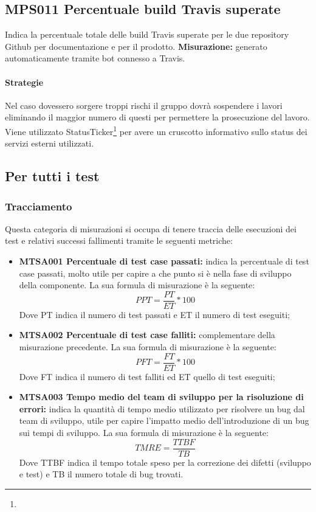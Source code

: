 \documentclass[NormeDiProgetto.tex]{subfiles}
\begin{document}
	\subsection{MPS011 Percentuale build Travis superate} Indica la percentuale totale delle build Travis superate per le due repository Github per documentazione e per il prodotto. 
	\textbf{Misurazione:} generato automaticamente tramite bot connesso a Travis. 
	
	\paragraph{Strategie}
	Nel caso dovessero sorgere troppi rischi il gruppo dovrà sospendere i lavori eliminando il maggior numero di questi per permettere la prosecuzione del lavoro.
	Viene utilizzato StatusTicker\footnote{} per avere un cruscotto informativo sullo status dei servizi esterni utilizzati.
	

	\subsection{Per tutti i test}
	\subsubsection{Tracciamento}
	Questa categoria di misurazioni si occupa di tenere traccia delle esecuzioni dei test e relativi successi fallimenti tramite le seguenti metriche:
	\begin{itemize}
		\item \textbf{MTSA001 Percentuale di test case passati:} indica la percentuale di test case passati, molto utile per capire a che punto si è nella fase di sviluppo della componente. La sua formula di misurazione è la seguente:
		\[PPT=\dfrac{PT}{ET}*100\]
		Dove PT indica il numero di test passati e ET il numero di test eseguiti;
		\item \textbf{MTSA002 Percentuale di test case falliti:} complementare della misurazione precedente. La sua formula di misurazione è la seguente:
		\[PFT=\dfrac{FT}{ET}*100\]
		Dove FT indica il numero di test falliti ed ET quello di test eseguiti;
		\item \textbf{MTSA003 Tempo medio del team di sviluppo per la risoluzione di errori:} indica la quantità di tempo medio utilizzato per risolvere un bug dal team di sviluppo, utile per capire l'impatto medio dell'introduzione di un bug sui tempi di sviluppo. La sua formula di misurazione è la seguente:
		\[TMRE=\dfrac{TTBF}{TB}\]
		Dove TTBF indica il tempo totale speso per la correzione dei difetti (sviluppo e test) e TB il numero totale di bug trovati.
	\end{itemize}
	
\end{document}
